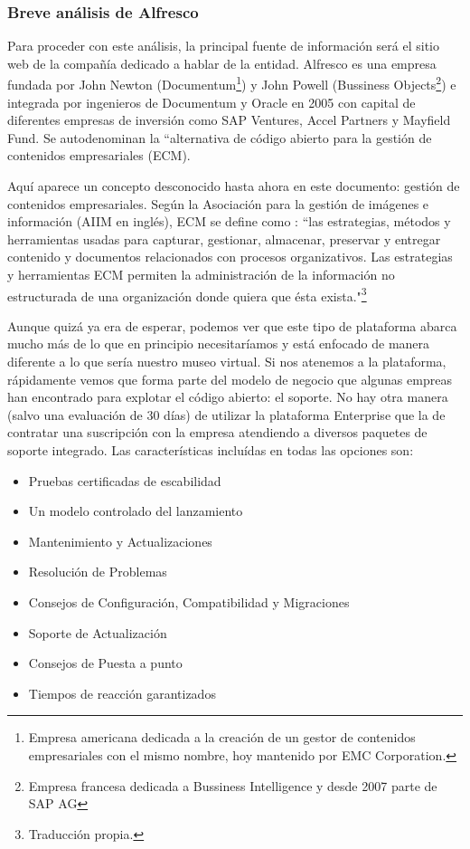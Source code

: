 \subsubsection{Breve análisis de Alfresco}
\par Para proceder con este análisis, la principal fuente de información será el sitio web de la compañía dedicado a hablar de la entidad. Alfresco es una empresa fundada por John Newton (Documentum\footnote{Empresa americana dedicada a la creación de un gestor de contenidos empresariales con el mismo nombre, hoy mantenido por EMC Corporation.\cite{references:documentum}}) y John Powell (Bussiness Objects\footnote{Empresa francesa dedicada a Bussiness Intelligence y desde 2007 parte de SAP AG\cite{references:bussinessobjects}}) e integrada por ingenieros de Documentum y Oracle en 2005 con capital de diferentes empresas de inversión como SAP Ventures, Accel Partners y Mayfield Fund. Se autodenominan la ``alternativa de código abierto para la gestión de contenidos empresariales (ECM)\cite{references:alfrescoabout}.
\par Aquí aparece un concepto desconocido hasta ahora en este documento: gestión de contenidos empresariales. Según la Asociación para la gestión de imágenes e información (AIIM en inglés), ECM se define como \cite{references:ecmaiim}: ``las estrategias, métodos y herramientas usadas para capturar, gestionar, almacenar, preservar y entregar contenido y documentos relacionados con procesos organizativos. Las estrategias y herramientas ECM permiten la administración de la información no estructurada de una organización donde quiera que ésta exista."\renewcommand{\thefootnote}{\fnsymbol{footnote}}\footnote[1]{Traducción propia.}\renewcommand{\thefootnote}{\arabic{footnote}}	

\par Aunque quizá ya era de esperar, podemos ver que este tipo de plataforma abarca mucho más de lo que en principio necesitaríamos y está enfocado de manera diferente a lo que sería nuestro museo virtual. Si nos atenemos a la plataforma, rápidamente vemos que forma parte del modelo de negocio que algunas empreas han encontrado para explotar el código abierto: el soporte. No hay otra manera (salvo una evaluación de 30 días) de utilizar la plataforma Enterprise que la de contratar una suscripción con la empresa atendiendo a diversos paquetes de soporte integrado. Las características incluídas en todas las opciones son:

\begin{itemize}
\item Pruebas certificadas de escabilidad
\item Un modelo controlado del lanzamiento
\item Mantenimiento y Actualizaciones
\item Resolución de Problemas
\item Consejos de Configuración, Compatibilidad y Migraciones
\item Soporte de Actualización
\item Consejos de Puesta a punto
\item Tiempos de reacción garantizados
\end{itemize}


